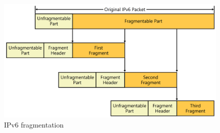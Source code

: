 \documentclass{report}
\begin{document}
\begin{figure}[H]
	\centering
    \includegraphics[width=\textwidth]{ipv6-fragmentation.png}
    \caption{IPv6 fragmentation\cite{book:microsoft:understanding-ipv6}}
    \label{fig:ipv6-fragmentation}
\end{figure}
\end{document}
